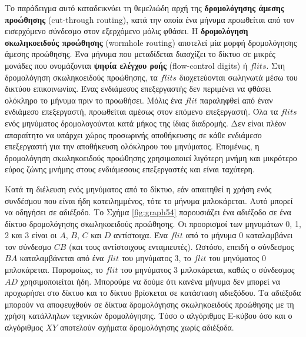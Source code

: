 \documentclass[12pt,a4paper]{article} %
\begin{document}
Το παράδειγμα αυτό καταδεικνύει τη θεμελιώδη αρχή της
\textbf{δρομολόγησης άμεσης προώθησης}
(cut-through routing), κατά την οποία ένα
μήνυμα προωθείται από τον εισερχόμενο σύνδεσμο στον εξερχόμενο μόλις φθάσει.
Η \textbf{δρομολόγηση σκωληκοειδούς προώθησης}
(wormhole routing) αποτελεί μία μορφή
δρομολόγησης άμεσης προώθησης. Ένα μήνυμα που μεταδίδεται διασχίζει το 
δίκτυο σε μικρές μονάδες που ονομάζονται \textbf{ψηφία ελέγχου ροής}
(flow-control digits) ή $flits$.
Στη δρομολόγηση σκωληκοειδούς προώθησης, τα $flits$ διοχετεύονται
σωληνωτά μέσω του δικτύου επικοινωνίας. Ένας ενδιάμεσος επεξεργαστής δεν 
περιμένει να φθάσει ολόκληρο το μήνυμα πριν το προωθήσει. Μόλις ένα $flit$ 
παραληφθεί από έναν ενδιάμεσο επεξεργαστή, προωθείται αμέσως στον επόμενο 
επεξεργαστή. Όλα τα $flits$ ενός μηνύματος δρομολογούνται κατά μήκος της 
ίδιας διαδρομής. Δεν είναι πλέον απαραίτητο να υπάρχει χώρος προσωρινής 
αποθήκευσης σε κάθε ενδιάμεσο επεξεργαστή για την αποθήκευση ολόκληρου του 
μηνύματος. Επομένως, η δρομολόγηση σκωληκοειδούς προώθησης χρησιμοποιεί 
λιγότερη μνήμη και μικρότερο εύρος ζώνης μνήμης στους ενδιάμεσους 
επεξεργαστές και είναι ταχύτερη.

Κατά τη διέλευση ενός μηνύματος από το δίκτυο, εάν απαιτηθεί η χρήση ενός
συνδέσμου που είναι ήδη κατειλημμένος, τότε το μήνυμα μπλοκάρεται. Αυτό μπορεί
να οδηγήσει σε αδιέξοδο. Το Σχήμα \ref{fig:graph54} παρουσιάζει ένα
αδιέξοδο σε ένα δίκτυο δρομολόγησης σκωληκοειδούς προώθησης. Οι προορισμοί 
των μηνυμάτων 0, 1, 2 και 3 είναι οι $A$, $B$, $C$ και $D$ αντίστοιχα. 
Ένα $flit$ από το μήνυμα 0 καταλαμβάνει τον σύνδεσμο $CB$ (και τους αντίστοιχους 
ενταμιευτές). Ωστόσο, επειδή ο σύνδεσμος $BA$ καταλαμβάνεται από ένα $flit$ 
του μηνύματος 3, το $flit$ του μηνύματος 0 μπλοκάρεται. Παρομοίως, το 
$flit$ του μηνύματος 3 μπλοκάρεται, καθώς ο σύνδεσμος $AD$ χρησιμοποιείται ήδη. 
Μπορούμε να δούμε ότι κανένα μήνυμα δεν μπορεί να προχωρήσει στο δίκτυο 
και το δίκτυο βρίσκεται σε κατάσταση αδιεξόδου. Τα αδιέξοδα μπορούν να 
αποφευχθούν σε δίκτυα δρομολόγησης σκωληκοειδούς προώθησης με τη χρήση 
κατάλληλων τεχνικών δρομολόγησης. Τόσο ο αλγόριθμος Ε-κύβου όσο και ο 
αλγόριθμος $XY$ αποτελούν σχήματα δρομολόγησης χωρίς αδιέξοδα.
\end{document}
